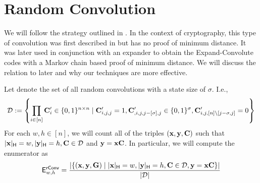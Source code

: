 

\section{Random Convolution}


We will follow the strategy outlined in . In the context of cryptography, this type of convolution was first described in \cite{silver} but has no proof of minimum distance. It was later used in conjunction with an expander to obtain the Expand-Convolute codes \cite{EC} with a Markov chain based proof of minimum distance. We will discuss the relation to \cite{EC} later and why our techniques are more effective. 

Let \dist denote the set of all random convolutions with a state size of $\sigma$. I.e.,
$$
\mathcal{D} := \left\{ \prod_{i\in [n]}\mathbf{C}'_i\in \{0,1\}^{n\times n} \mid \mathbf{C}'_{i,j,j}=1, \mathbf{C}'_{,i,j,j-[\sigma],j}\in\{0,1\}^\sigma, \mathbf{C}'_{i,j,[n]\setminus [j-\sigma,j]}=0\right\}
$$
For each $w,h\in [n]$, we will count all of the triples $(\mathbf{x},\mathbf{y},\mathbf{C})$ such that $|\mathbf{x}|_\mathsf{H}=w,|\mathbf{y}|_\mathsf{H}=h, \mathbf{C}\in \mathcal{D}$ and $\mathbf{y} = \mathbf{x}\mathbf{C}$. In particular, we will compute the enumerator as 
$$
\mathsf{E}^{\textsf{rConv}}_{w,h} = \frac{|\{(\mathbf{x},\mathbf{y},\mathbf{G}) \mid |\mathbf{x}|_\mathsf{H}=w,|\mathbf{y}|_\mathsf{H}=h, \mathbf{C}\in \mathcal{D}, \mathbf{y} = \mathbf{x}\mathbf{C} \}|}{|\mathcal{D}|}
$$

